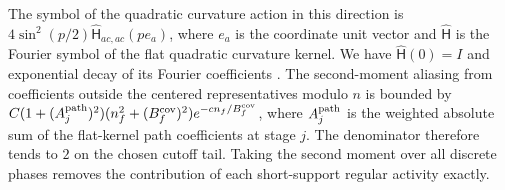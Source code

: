 \documentclass[11pt,a4paper]{article}
\numberwithin{equation}{section}
\begin{document}
The symbol of the quadratic curvature action in this direction is \(4\sin^2(p/2)\widehat{\mathsf H}_{ac,ac}(pe_a)\), where \(e_a\) is the coordinate unit vector and \(\widehat{\mathsf H}\) is the Fourier symbol of the flat quadratic curvature kernel. We have \(\widehat{\mathsf H}(0)=I\) and exponential decay of its Fourier coefficients \cite[Lemmas 12.3--12.4]{armstrong}. The second-moment aliasing from coefficients outside the centered representatives modulo \(n\) is bounded by
\(C(1+(A_j^{\rm path})^2)(n_f^2+(B_f^{\mathrm{cov}})^2)e^{-c n_f/B_f^{\mathrm{cov}}}\),
where \(A_j^{\rm path}\) is the weighted absolute sum of the flat-kernel path coefficients at stage \(j\). The denominator therefore tends to \(2\) on the chosen cutoff tail. Taking the second moment over all discrete phases removes the contribution of each short-support regular activity exactly.
\end{document}
